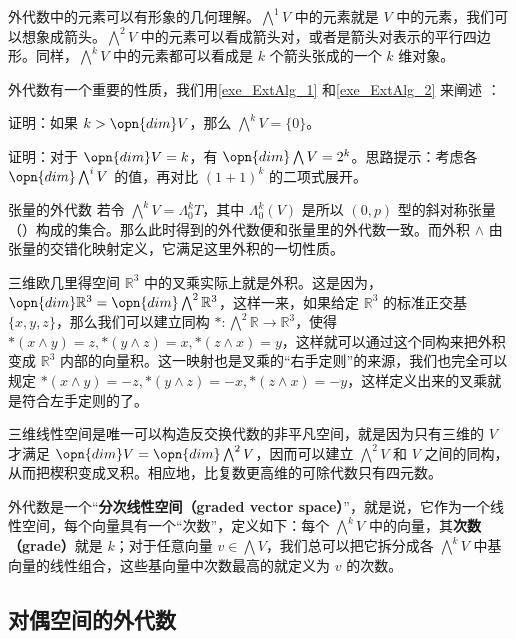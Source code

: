 外代数中的元素可以有形象的几何理解。$\bigwedge^1 V$ 中的元素就是 $V$ 中的元素，我们可以想象成箭头。$\bigwedge^2 V$ 中的元素可以看成箭头对，或者是箭头对表示的平行四边形。同样，$\bigwedge^k V$ 中的元素都可以看成是 $k$ 个箭头张成的一个 $k$ 维对象。

外代数有一个重要的性质，我们用\autoref{exe_ExtAlg_1} 和\autoref{exe_ExtAlg_2} 来阐述 ：

\begin{exercise}{}\label{exe_ExtAlg_1}
证明：如果 $k>\opn{dim} V$，那么 $\bigwedge^kV=\{0\}$。
\end{exercise}

\begin{exercise}{}\label{exe_ExtAlg_2}
证明：对于 $\opn{dim} V=k$，有 $\opn{dim} \bigwedge V=2^k$。思路提示：考虑各 $\opn{dim}\bigwedge^iV$ 的值，再对比 $(1+1)^k$ 的二项式展开。
\end{exercise}
\begin{example}{张量的外代数}
若令 $\bigwedge^k V=\Lambda^k_0 T$，其中 $\Lambda^k_0(V)$ 是所以 $(0,p)$ 型的斜对称张量（）构成的集合。那么此时得到的外代数便和张量里的外代数一致。而外积 $\wedge$ 由张量的交错化映射定义，它满足这里外积的一切性质。
\end{example}



三维欧几里得空间 $\mathbb{R}^3$ 中的叉乘实际上就是外积。这是因为，$\opn{dim}\mathbb{R}^3=\opn{dim}\bigwedge^2\mathbb{R}^3$，这样一来，如果给定 $\mathbb{R}^3$ 的标准正交基 $\{x, y, z\}$，那么我们可以建立同构 $*: \bigwedge^2\mathbb{R}\rightarrow\mathbb{R}^3$，使得 $*(x\wedge y)=z, *(y\wedge z)=x, *(z\wedge x)=y$，这样就可以通过这个同构来把外积变成 $\mathbb{R}^3$ 内部的向量积。这一映射也是叉乘的“右手定则”的来源，我们也完全可以规定 $*(x\wedge y)=-z, *(y\wedge z)=-x, *(z\wedge x)=-y$，这样定义出来的叉乘就是符合左手定则的了。

三维线性空间是唯一可以构造反交换代数的非平凡空间，就是因为只有三维的 $V$ 才满足 $\opn{dim}V=\opn{dim}\bigwedge^2V$，因而可以建立 $\bigwedge^2 V$ 和 $V$ 之间的同构，从而把楔积变成叉积。相应地，比复数更高维的可除代数只有四元数。

外代数是一个“\textbf{分次线性空间（graded vector space）}”，就是说，它作为一个线性空间，每个向量具有一个“次数”，定义如下：每个 $\bigwedge^kV$ 中的向量，其\textbf{次数（grade）}就是 $k$；对于任意向量 $v\in \bigwedge V$，我们总可以把它拆分成各 $\bigwedge^kV$ 中基向量的线性组合，这些基向量中次数最高的就定义为 $v$ 的次数。


\subsection{对偶空间的外代数}\label{sub_ExtAlg_1}

